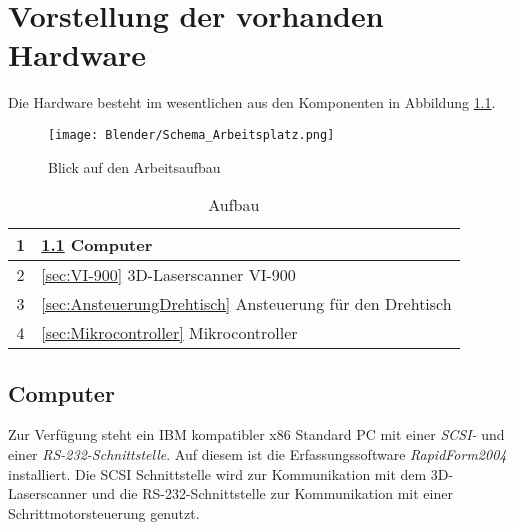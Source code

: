 \chapter{Vorstellung der vorhanden Hardware}
\label{sec:Hardware}
Die Hardware besteht im wesentlichen aus den Komponenten in Abbildung \ref{fig:Übersicht}.
\begin{figure}[htb]
\centering
\texttt{[image: Blender/Schema\_Arbeitsplatz.png]}
\caption{Blick auf den Arbeitsaufbau}
\label{fig:Übersicht}
\end{figure}
\begin{table}[htb]
\begin{tabular}{|c|l|}	\hline 
\rule[-1ex]{0pt}{2.5ex} 1 & 
\ref{sec:Computer} Computer\\ \hline 
\rule[-1ex]{0pt}{2.5ex} 2 & 
\ref{sec:VI-900} 3D-Laserscanner VI-900\\ \hline 
\rule[-1ex]{0pt}{2.5ex} 3 & 
\ref{sec:AnsteuerungDrehtisch} Ansteuerung für den Drehtisch\\ \hline 
\rule[-1ex]{0pt}{2.5ex} 4 & 
\ref{sec:Mikrocontroller} Mikrocontroller\\ \hline 
\end{tabular} 
\caption{Aufbau}
\label{tbl:Aufbau}
\end{table}
\section{Computer}
\label{sec:Computer}
Zur Verfügung steht ein IBM kompatibler x86 Standard PC mit 
einer \emph{SCSI-} und einer \emph{RS-232-Schnittstelle}. Auf diesem ist die Erfassungssoftware \emph{RapidForm2004} installiert. Die SCSI Schnittstelle wird zur Kommunikation mit dem 3D-Laserscanner und die RS-232-Schnittstelle zur Kommunikation mit einer Schrittmotorsteuerung genutzt.
